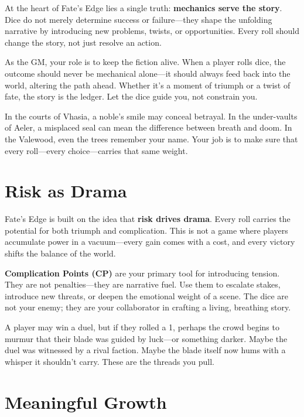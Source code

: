 At the heart of Fate's Edge lies a single truth: \textbf{mechanics serve the story}. Dice do not merely determine success or failure---they shape the unfolding narrative by introducing new problems, twists, or opportunities. Every roll should change the story, not just resolve an action.

As the GM, your role is to keep the fiction alive. When a player rolls dice, the outcome should never be mechanical alone---it should always feed back into the world, altering the path ahead. Whether it's a moment of triumph or a twist of fate, the story is the ledger. Let the dice guide you, not constrain you.

In the courts of Vhasia, a noble's smile may conceal betrayal. In the under-vaults of Aeler, a misplaced seal can mean the difference between breath and doom. In the Valewood, even the trees remember your name. Your job is to make sure that every roll---every choice---carries that same weight.

\section*{Risk as Drama}

Fate's Edge is built on the idea that \textbf{risk drives drama}. Every roll carries the potential for both triumph and complication. This is not a game where players accumulate power in a vacuum---every gain comes with a cost, and every victory shifts the balance of the world.

\textbf{Complication Points (CP)} are your primary tool for introducing tension. They are not penalties---they are narrative fuel. Use them to escalate stakes, introduce new threats, or deepen the emotional weight of a scene. The dice are not your enemy; they are your collaborator in crafting a living, breathing story.

A player may win a duel, but if they rolled a 1, perhaps the crowd begins to murmur that their blade was guided by luck---or something darker. Maybe the duel was witnessed by a rival faction. Maybe the blade itself now hums with a whisper it shouldn't carry. These are the threads you pull.

\section*{Meaningful Growth}

